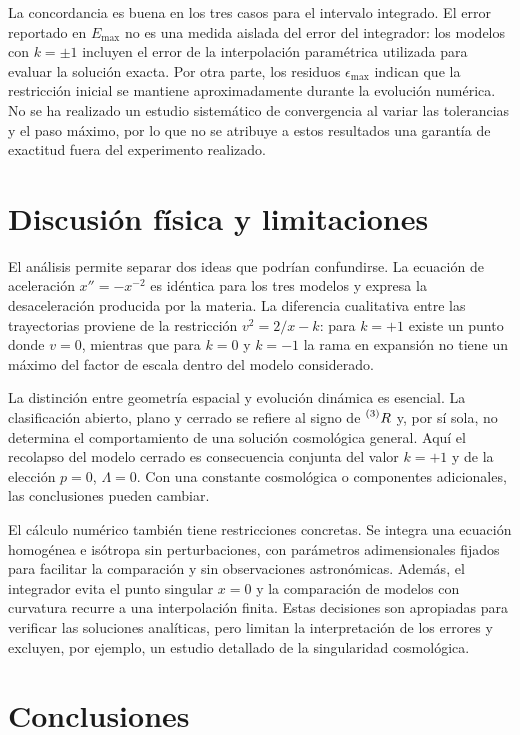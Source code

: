 \documentclass[letterpaper,11pt]{article}
\newcommand{\Rthree}{\prescript{(3)}{}{R}}
\begin{document}
La concordancia es buena en los tres casos para el intervalo integrado. El error reportado en $E_{\max}$ no es una medida aislada del error del integrador: los modelos con $k=\pm1$ incluyen el error de la interpolación paramétrica utilizada para evaluar la solución exacta. Por otra parte, los residuos $\epsilon_{\max}$ indican que la restricción inicial se mantiene aproximadamente durante la evolución numérica. No se ha realizado un estudio sistemático de convergencia al variar las tolerancias y el paso máximo, por lo que no se atribuye a estos resultados una garantía de exactitud fuera del experimento realizado.

\section{Discusión física y limitaciones}

El análisis permite separar dos ideas que podrían confundirse. La ecuación de aceleración $x''=-x^{-2}$ es idéntica para los tres modelos y expresa la desaceleración producida por la materia. La diferencia cualitativa entre las trayectorias proviene de la restricción $v^2=2/x-k$: para $k=+1$ existe un punto donde $v=0$, mientras que para $k=0$ y $k=-1$ la rama en expansión no tiene un máximo del factor de escala dentro del modelo considerado.

La distinción entre geometría espacial y evolución dinámica es esencial. La clasificación abierto, plano y cerrado se refiere al signo de $\Rthree$ y, por sí sola, no determina el comportamiento de una solución cosmológica general. Aquí el recolapso del modelo cerrado es consecuencia conjunta del valor $k=+1$ y de la elección $p=0$, $\Lambda=0$. Con una constante cosmológica o componentes adicionales, las conclusiones pueden cambiar.

El cálculo numérico también tiene restricciones concretas. Se integra una ecuación homogénea e isótropa sin perturbaciones, con parámetros adimensionales fijados para facilitar la comparación y sin observaciones astronómicas. Además, el integrador evita el punto singular $x=0$ y la comparación de modelos con curvatura recurre a una interpolación finita. Estas decisiones son apropiadas para verificar las soluciones analíticas, pero limitan la interpretación de los errores y excluyen, por ejemplo, un estudio detallado de la singularidad cosmológica.

\section{Conclusiones}
\end{document}
